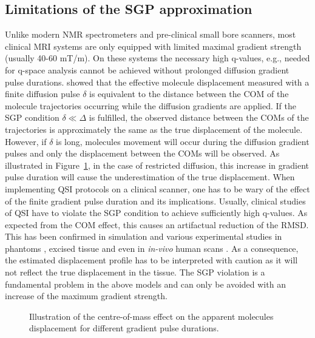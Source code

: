 \subsection{Limitations of the SGP approximation}
\label{sec:chapter2 limits of SGP}
Unlike modern \gls{NMR} spectrometers and pre-clinical small bore scanners, most clinical MRI systems are only equipped with limited maximal gradient strength (usually 40-60 mT/m). On these systems the necessary high q-values, e.g., needed for q-space analysis cannot be achieved without prolonged diffusion gradient pulse durations. \citet{Mitra:1995} showed that the effective molecule displacement measured with a finite diffusion pulse $\delta$ is equivalent to the distance between the \gls{COM} of the molecule trajectories occurring while the diffusion gradients are applied. If the \gls{SGP} condition $ \delta \ll \Delta$ is fulfilled, the observed distance between the \glspl{COM} of the trajectories is approximately the same as the true displacement of the molecule. However, if $\delta$ is long, molecules movement will occur during the diffusion gradient pulses and only the displacement between the \gls{COM}s will be observed. As illustrated in Figure~\ref{fig:chapter2 com effect}, in the case of restricted diffusion, this increase in gradient pulse duration will cause the underestimation of the true displacement. 
When implementing QSI protocols on a clinical scanner, one has to be wary of the effect of the finite gradient pulse duration and its implications. Usually, clinical studies of QSI have to violate the \gls{SGP} condition to achieve sufficiently high q-values. As expected from the \gls{COM} effect, this causes an artifactual reduction of the \gls{RMSD}. This has been confirmed in simulation \citep{Linse:1995,Latt:2007a} and various experimental studies in phantoms \citep{Avram:2004,Latt:2007}, excised tissue \citep{Malmborg:2006,Bar-Shir:2008} and even in \emph{in-vivo} human scans \citep{Nilsson:2009}. As a consequence, the estimated displacement profile has to be interpreted with caution as it will not reflect the true displacement in the tissue. The \gls{SGP} violation is a fundamental problem in the above models and can only be avoided with an increase of the maximum gradient strength. 

\begin{figure}[htbp]
	\centering
	\caption{Illustration of the centre-of-mass effect on the apparent molecules displacement for different gradient pulse durations.}
	\label{fig:chapter2 com effect}
\end{figure}

